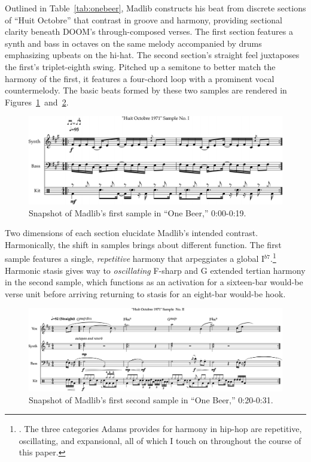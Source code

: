\normalsize Outlined in Table~\ref{tab:onebeer}, Madlib constructs his beat from discrete sections of ``Huit Octobre'' that contrast in groove and harmony, providing sectional clarity beneath DOOM's through-composed verses. The first section features a synth and bass in octaves on the same melody accompanied by drums emphasizing upbeats on the hi-hat. The second section's straight feel juxtaposes the first's triplet-eighth swing. Pitched up a semitone to better match the harmony of the first, it features a four-chord loop with a prominent vocal countermelody. The basic beats formed by these two samples are rendered in Figures~\ref{fig:onebeerintro}~and~\ref{fig:onebeermain}.

    \begin{figure}[ht]
        \centering
        \includegraphics[width=\textwidth]{images/figures/chp 02/000019onebeerintro.pdf}
        \caption{Snapshot of Madlib's first sample in ``One Beer,'' 0:00-0:19.}
        \label{fig:onebeerintro}
    \end{figure}

Two dimensions of each section elucidate Madlib's intended contrast. Harmonically, the shift in samples brings about different function. The first sample features a single, \emph{repetitive} harmony that arpeggiates a global I$^{b7}$.\footnote{\cite{kyleadamsHarmonicSyntacticMotivic2020}. The three categories Adams provides for harmony in hip-hop are repetitive, oscillating, and expansional, all of which I touch on throughout the course of this paper.} Harmonic stasis gives way to \emph{oscillating} F-sharp and G extended tertian harmony in the second sample, which functions as an activation for a sixteen-bar would-be verse unit before arriving returning to stasis for an eight-bar would-be hook.

    \begin{figure}[ht]
        \centering
        \includegraphics[width=\textwidth]{images/figures/chp 02/02031onebeermain.pdf}
        \caption{Snapshot of Madlib's first second sample in ``One Beer,'' 0:20-0:31.}
        \label{fig:onebeermain}
    \end{figure}


